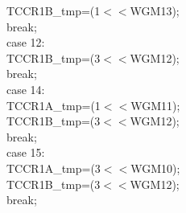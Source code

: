 \documentclass[titlepage, a4paper, 10pt, reqno, openany]{report}
\begin{document}
\begin{minipage}[t]{.35\linewidth}
	\hspace*{1.5cm}			TCCR1B\_tmp=(1$<<$WGM13); \\
	\hspace*{1.5cm}			break; \\
	\hspace*{1cm}		case 12: \\
	\hspace*{1.5cm}			TCCR1B\_tmp=(3$<<$WGM12); \\
	\hspace*{1.5cm}			break; \\
	\hspace*{1cm}		case 14: \\
	\hspace*{1.5cm}			TCCR1A\_tmp=(1$<<$WGM11); \\
	\hspace*{1.5cm}			TCCR1B\_tmp=(3$<<$WGM12); \\
	\hspace*{1.5cm}			break; \\
	\hspace*{1cm}		case 15: \\
	\hspace*{1.5cm}			TCCR1A\_tmp=(3$<<$WGM10); \\
	\hspace*{1.5cm}			TCCR1B\_tmp=(3$<<$WGM12); \\
	\hspace*{1.5cm}			break;
\end{minipage}
\vline \quad
\end{document}
